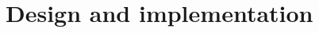 \documentclass{epr400}
\begin{document}
\renewcommand{\eprthepartname}{Design and implementation}
\setcounter{section}{2}
\section{Design and implementation}

\clearpage


\clearpage
\appendix

\end{document}
